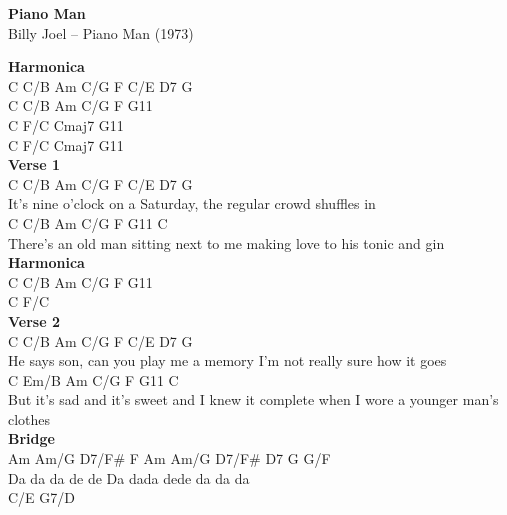\documentclass[a4paper]{article}
\begin{document}
    \begin{center}
        \textbf{Piano Man}
        ~\\
        Billy Joel -- Piano Man (1973)
    \end{center}
    {
        \scriptsize
        \textbf{Harmonica}
        ~\\
        {
            \cutive
            \obeyspaces
C  C/B  Am  C/G  F  C/E  D7  G
\\
C  C/B  Am  C/G  F  G11
\\
C  F/C  Cmaj7  G11
\\
C  F/C  Cmaj7  G11
\\

        }
        \textbf{Verse 1}
        ~\\
        {
            \cutive
            \obeyspaces
     C      C/B        Am       C/G  F             C/E            D7   G
\\
It's nine o'clock on a Saturday,       the regular crowd shuffles in
\\
           C     C/B       Am        C/G       F           G11       C
\\
There's an old man sitting next to me   making love to his tonic and gin
\\

        }
        \textbf{Harmonica}
        ~\\
        {
            \cutive
            \obeyspaces
C  C/B  Am  C/G  F  G11
\\
C       F/C
\\

        }
        \textbf{Verse 2}
        ~\\
        {
            \cutive
            \obeyspaces
        C            C/B       Am    C/G    F           C/E        D7    G
\\
He says son, can you play me a memory   I'm not really sure how it goes
\\
         C            Em/B        Am      C/G           F        G11           C
\\
But it's sad and it's sweet and I knew it complete when I wore a younger man's clothes
\\

        }
        \textbf{Bridge}
        ~\\
        {
            \cutive
            \obeyspaces
Am       Am/G      D7/F\#      F  Am      Am/G          D7/F\#     D7   G   G/F
\\
Da da da     de de Da               dada          dede da          da da
\\
C/E  G7/D
\\

}}
\end{document}
